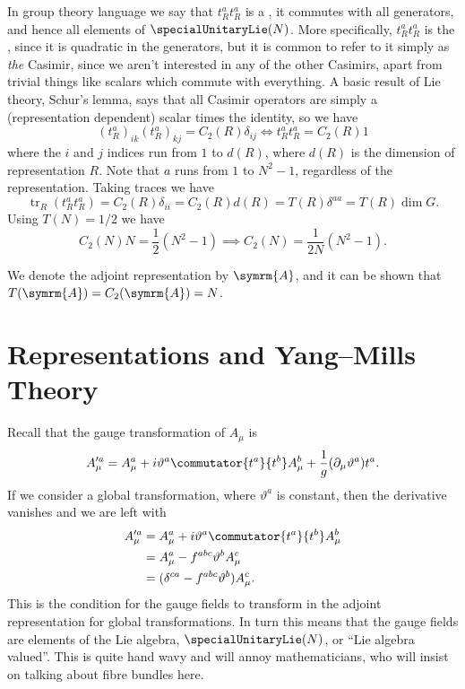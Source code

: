 \documentclass[fleqn]{NotesClass}
\DeclareMathOperator{\tr}{tr}
\newcommand{\adjointRep}{\symrm{A}}
\begin{document}
    In group theory language we say that \(t_R^at_R^a\) is a , it commutes with all generators, and hence all elements of \(\specialUnitaryLie(N)\).
    More specifically, \(t_R^at_R^a\) is the , since it is quadratic in the generators, but it is common to refer to it simply as \emph{the} Casimir, since we aren't interested in any of the other Casimirs, apart from trivial things like scalars which commute with everything.
    A basic result of Lie theory, Schur's lemma, says that all Casimir operators are simply a (representation dependent) scalar times the identity, so we have
    \begin{equation}
        (t_R^a)_{ik}(t_R^a)_{kj} = C_2(R)\delta_{ij} \iff t_R^at_R^a = C_2(R)1
    \end{equation}
    where the \(i\) and \(j\) indices run from \(1\) to \(d(R)\), where \(d(R)\) is the dimension of representation \(R\).
    Note that \(a\) runs from \(1\) to \(N^2 - 1\), regardless of the representation.
    Taking traces we have
    \begin{equation}
        \tr_R(t_R^at_R^a) = C_2(R)\delta_{ii} = C_2(R)d(R) = T(R)\delta^{aa} = T(R)\dim G.
    \end{equation}
    Using \(T(N) = 1/2\) we have
    \begin{equation}
        C_2(N)N = \frac{1}{2}(N^2 - 1) \implies C_2(N) = \frac{1}{2N}(N^2 - 1).
    \end{equation}
    
    We denote the adjoint representation by \(\adjointRep\), and it can be shown that \(T(\adjointRep) = C_2(\adjointRep) = N\).
    
    \section{Representations and Yang--Mills Theory}
    Recall that the gauge transformation of \(A_\mu\) is
    \begin{equation}
        A'^a_\mu = A^a_\mu + i\vartheta^a \commutator{t^a}{t^b}A^b_\mu + \frac{1}{g}(\partial_\mu \vartheta^a)t^a.
    \end{equation}
    If we consider a global transformation, where \(\vartheta^a\) is constant, then the derivative vanishes and we are left with
    \begin{align}
        A'^a_\mu &= A^a_\mu + i\vartheta^a \commutator{t^a}{t^b}A^b_\mu\\
        &= A^a_\mu - f^{abc}\vartheta^b A^c_\mu\\
        &= (\delta^{ca} - f^{abc}\vartheta^b)A^c_\mu.
    \end{align}
    This is the condition for the gauge fields to transform in the adjoint representation for global transformations.
    In turn this means that the gauge fields are elements of the Lie algebra, \(\specialUnitaryLie(N)\), or \enquote{Lie algebra valued}.
    This is quite hand wavy and will annoy mathematicians, who will insist on talking about fibre bundles here.
    
\end{document}
